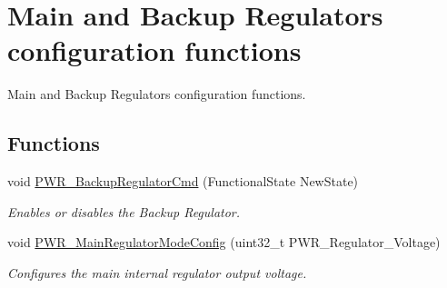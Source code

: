 \hypertarget{group___p_w_r___group4}{\section{Main and Backup Regulators configuration functions}
\label{group___p_w_r___group4}
}


Main and Backup Regulators configuration functions.  


\subsection*{Functions}
\begin{DoxyCompactItemize}
\item 
void \hyperlink{group___p_w_r___group4_ga83a4d6c5b048f2dab18e8fb04f5368d7}{P\-W\-R\-\_\-\-Backup\-Regulator\-Cmd} (Functional\-State New\-State)
\begin{DoxyCompactList}\small\item\em Enables or disables the Backup Regulator. \end{DoxyCompactList}\item 
void \hyperlink{group___p_w_r___group4_gada193dea79762f379d4e666a98f28d89}{P\-W\-R\-\_\-\-Main\-Regulator\-Mode\-Config} (uint32\-\_\-t P\-W\-R\-\_\-\-Regulator\-\_\-\-Voltage)
\begin{DoxyCompactList}\small\item\em Configures the main internal regulator output voltage. \end{DoxyCompactList}\end{DoxyCompactItemize}


